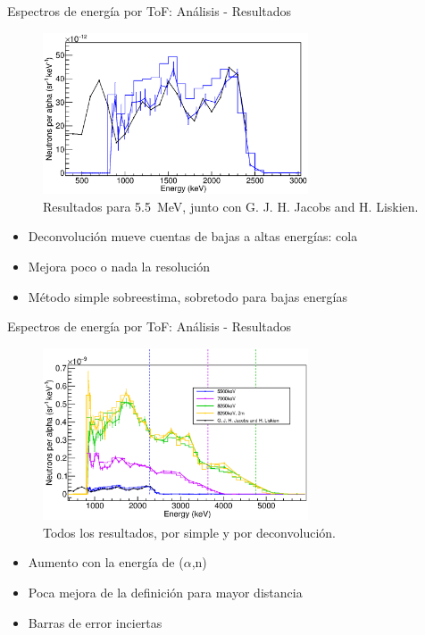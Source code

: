 \documentclass[11pt]{beamer}
\newcommand{\an}{($\alpha$,n) }
\begin{document}
\begin{frame}{Espectros de energía por ToF: Análisis - Resultados}
	\begin{figure}[H]
		\centering
		\includegraphics[width=0.70\textwidth]{pulsed_5mev.eps}
		\caption{Resultados para \qty{5.5}{\MeV}, junto con G. J. H. Jacobs and H. Liskien\cite{jacobs}.}
		\label{}
	\end{figure}
	\begin{itemize}
		\item Deconvolución mueve cuentas de bajas a altas energías: cola
		\item Mejora poco o nada la resolución
		\item Método simple sobreestima, sobretodo para bajas energías
	\end{itemize}
\end{frame}

\begin{frame}{Espectros de energía por ToF: Análisis - Resultados}
	\begin{figure}[H]
		\centering
		\includegraphics[width=0.70\textwidth]{pulsed_results.eps}
		\caption{Todos los resultados, por simple y por deconvolución.}
		\label{}
	\end{figure}
	\begin{itemize}
		\item Aumento con la energía de \an
		\item Poca mejora de la definición para mayor distancia
		\item Barras de error inciertas
	\end{itemize}
\end{frame}
\end{document}
